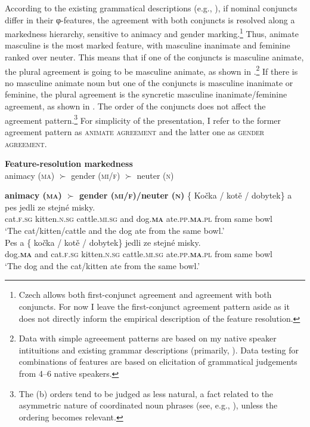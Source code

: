 \documentclass[output=paper,
modfonts
newtxmath,
hidelinks
]{langscibook}
\begin{document}
According to the existing grammatical descriptions (e.g., \citealt{Panevova1997}), if nominal conjuncts differ in their φ-features, the agreement with both conjuncts is resolved along a markedness hierarchy, sensitive to animacy and gender marking.\footnote{Czech allows both first-conjunct agreement and agreement with both conjuncts. For now I leave the first-conjunct agreement pattern aside as it does not directly inform the empirical description of the feature resolution.} Thus, animate masculine is the most marked feature, with masculine inanimate and feminine ranked over neuter. This means that if one of the conjuncts is masculine animate, the plural agreement is going to be masculine animate, as shown in .\footnote{Data with simple agreeement patterns are based on my native speaker intituitions and existing grammar descriptions (primarily, \citealt{Panevova1997,corbett83}). Data testing for combinations of features are based on elicitation of grammatical judgements from 4--6 native speakers.} If there is no masculine animate noun but one of the conjuncts is masculine inanimate or feminine, the plural agreement is the syncretic masculine inanimate/feminine agreement, as shown in . The order of the conjuncts does not affect the agreement pattern.\footnote{The (b) orders tend to be judged as less natural, a fact related to the asymmetric nature of coordinated noun phrases (see, e.g., \citealt{Johannessen1996}), unless the ordering becomes relevant.} For simplicity of the presentation, I refer to the former agreement pattern as \textsc{animate agreement} and the latter one as \textsc{gender agreement}. 

\ea \textbf{Feature-resolution markedness}\\
animacy (\textsc{ma}) $\succ$ gender ({\textsc{mi}/\textsc{f}}) $\succ$ neuter (\textsc{n})
\z

\ea\label{baseline-anim} \textbf{animacy (\textsc{ma}) $\succ$ gender ({\textsc{mi}/\textsc{f}})/neuter (\textsc{n})}
\ea\gll \{\hspace{-2pt} Kočka / kotě / dobytek\} a pes jedli ze stejné misky.\\
{} cat.\textsc{f.sg} {} kitten.\textsc{n.sg} {} cattle.\textsc{mi.sg} and dog.\textsc{\textbf{ma}} ate.\textsc{pp.\textbf{ma}.pl} from same bowl\\
\glt `The cat/kitten/cattle and the dog ate from the same bowl.'\\\hfill {}\smallskip
\ex\gll Pes a \{\hspace{-2pt} kočka / kotě / dobytek\} jedli ze stejné misky.\\
dog.\textsc{\textbf{ma}} and {} cat.\textsc{f.sg} {} kitten.\textsc{n.sg} {} cattle.\textsc{mi.sg} ate.\textsc{pp.\textbf{ma}.pl} from same bowl\\
\glt `The dog and the cat/kitten ate from the same bowl.'\\\hfill {}
\z\z
\end{document}
